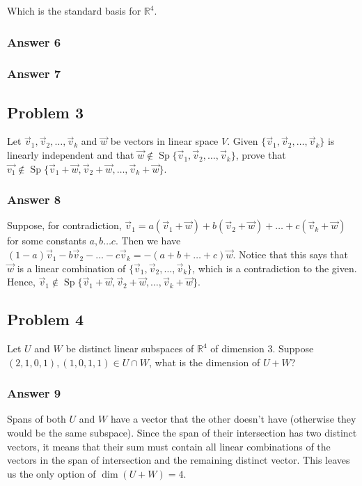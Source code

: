 \documentclass[11pt]{article}
\DeclareMathOperator{\Sp}{Sp}
\begin{document}
Which is the standard basis for $\mathbb{R}^4$.

\subsubsection{Answer 6}
\label{sec-1-2-3}

\subsubsection{Answer 7}
\label{sec-1-2-4}

\subsection{Problem 3}
\label{sec-1-3}
Let $\vec{v}_1, \vec{v}_2, \dots, \vec{v}_k$ and $\vec{w}$ be vectors in
linear space $V$.  Given $\{\vec{v}_1, \vec{v}_2, \dots, \vec{v}_k\}$ is
linearly independent and that $\vec{w} \not \in \Sp\{\vec{v}_1, \vec{v}_2,
   \dots, \vec{v}_k\}$, prove that $\vec{v_1} \not \in \Sp\{\vec{v}_1 + \vec{w},
   \vec{v}_2 + \vec{w}, \dots, \vec{v}_k + \vec{w}\}$.

\subsubsection{Answer 8}
\label{sec-1-3-1}
 Suppose, for contradiction, $\vec{v}_1 = a(\vec{v}_1 + \vec{w}) +
   b(\vec{v}_2 + \vec{w}) + \dots + c(\vec{v}_k + \vec{w})$ for some constants
$a, b \dots c$.  Then we have $(1 - a)\vec{v}_1 - b\vec{v}_2 - \dots -
   c\vec{v}_k = -(a + b + \dots + c)\vec{w}$.  Notice that this says that
$\vec{w}$ is a linear combination of $\{\vec{v}_1, \vec{v}_2, \dots,
   \vec{v}_k\}$, which is a contradiction to the given.  Hence, $\vec{v}_1 \not
   \in \Sp\{\vec{v}_1 + \vec{w}, \vec{v}_2 + \vec{w}, \dots, \vec{v}_k +
   \vec{w}\}$.

\subsection{Problem 4}
\label{sec-1-4}
Let $U$ and $W$ be distinct linear subspaces of $\mathbb{R}^4$ of
dimension 3.  Suppose $(2, 1, 0, 1), (1, 0, 1, 1) \in U \cap W$, what is the
dimension of $U + W$?

\subsubsection{Answer 9}
\label{sec-1-4-1}
Spans of both $U$ and $W$ have a vector that the other doesn't have
(otherwise they would be the same subspace).  Since the span of their
intersection has two distinct vectors, it means that their sum must contain
all linear combinations of the vectors in the span of intersection and the
remaining distinct vector.  This leaves us the only option of $\dim(U+W) =
    4$.
\end{document}
